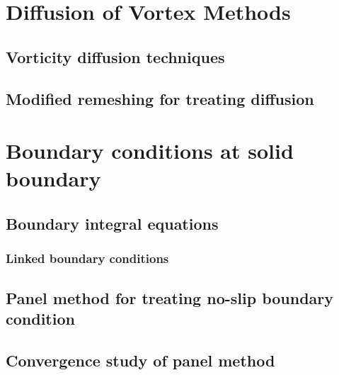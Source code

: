\section{Diffusion of Vortex Methods}

\subsection{Vorticity diffusion techniques}

\subsection{Modified remeshing for treating diffusion}

\section{Boundary conditions at solid boundary}

\subsection{Boundary integral equations}

\subsubsection{Linked boundary conditions}

\subsection{Panel method for treating no-slip boundary condition}

\subsection{Convergence study of panel method}

